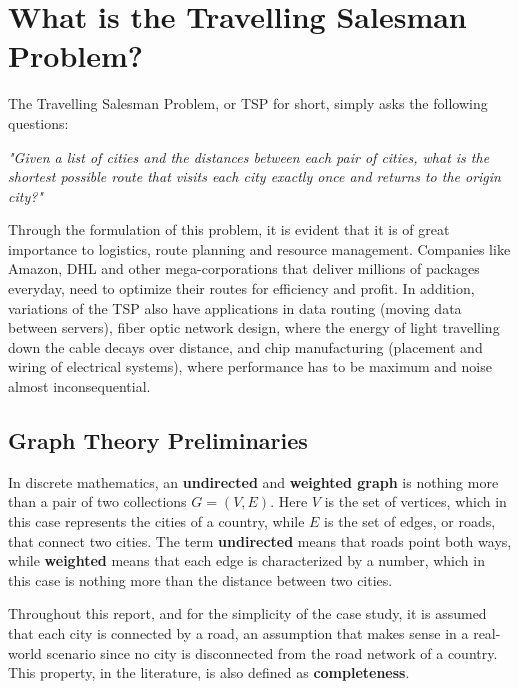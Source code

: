 
\section{What is the Travelling Salesman Problem?}
\label{sec: tsp}

The Travelling Salesman Problem, or TSP for short, simply asks the following questions:
\vspace{3mm}

\textit{"Given a list of cities and the distances between each pair of cities, what is the shortest possible route that visits each city exactly once and returns to the origin city?"}

\vspace{3mm}
Through the formulation of this problem, it is evident that it is of great importance to logistics, route planning and resource management. Companies like Amazon, DHL and other mega-corporations that deliver millions of packages everyday, need to optimize their routes for efficiency and profit. In addition, variations of the TSP also have applications in data routing (moving data between servers), fiber optic network design, where the energy of light travelling down the cable decays over distance, and chip manufacturing (placement and wiring of electrical systems), where performance has to be maximum and noise almost inconsequential.

\subsection{Graph Theory Preliminaries}
In discrete mathematics, an \textbf{undirected} and \textbf{weighted graph} is nothing more than a pair of two collections \( G = (V, E) \). Here \( V \) is the set of vertices, which in this case represents the cities of a country, while \( E \) is the set of edges, or roads, that connect two cities. The term \textbf{undirected} means that roads point both ways, while \textbf{weighted} means that each edge is characterized by a number, which in this case is nothing more than the distance between two cities.

Throughout this report, and for the simplicity of the case study, it is assumed that each city is connected by a road, an assumption that makes sense in a real-world scenario since no city is disconnected from the road network of a country. This property, in the literature, is also defined as \textbf{completeness}.

